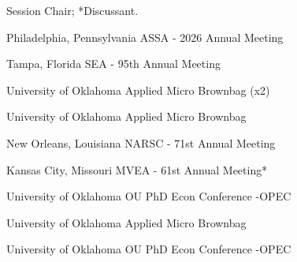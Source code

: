 \textdagger Session Chair; *Discussant.


{%
	Philadelphia, Pennsylvania}
{%
	ASSA - 2026 Annual Meeting\ec}
{}


{%
	Tampa, Florida}
{%
	SEA - 95th Annual Meeting}
{}

{%
	University of Oklahoma}
{%
	Applied Micro Brownbag (x2)}
{}

{%
	University of Oklahoma}
{%
	Applied Micro Brownbag}
{}

{%
	New Orleans, Louisiana}
{%
	NARSC - 71st Annual Meeting\ec}
{}

{%
	Kansas City, Missouri}
{%
	MVEA - 61st Annual Meeting*}
{}


{%
	University of Oklahoma}
{%
	OU PhD Econ Conference -OPEC}
{}

{%
	University of Oklahoma}
{%
	Applied Micro Brownbag}
{}

{%
	University of Oklahoma}
{%
	OU PhD Econ Conference -OPEC}
{}